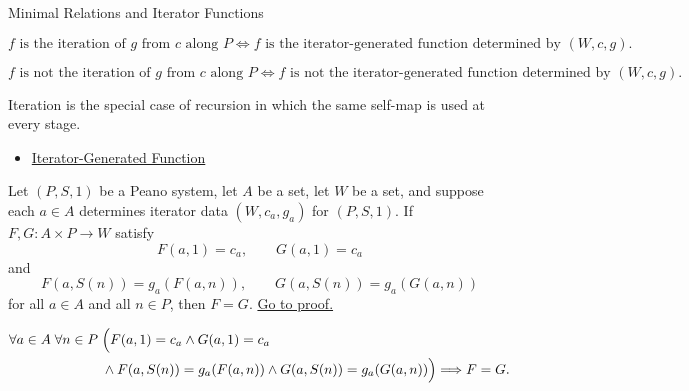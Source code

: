 \begin{topicbox}{Minimal Relations and Iterator Functions}
\begin{remark*}
\[
f \text{ is the iteration of } g \text{ from } c \text{ along } P
\Longleftrightarrow
f \text{ is the iterator-generated function determined by } (W,c,g).
\]
\end{remark*}


\begin{remark*}
\[
f \text{ is not the iteration of } g \text{ from } c \text{ along } P
\Longleftrightarrow
f \text{ is not the iterator-generated function determined by } (W,c,g).
\]
\end{remark*}

\begin{remark*}[Interpretation]
Iteration is the special case of recursion in which the same self-map is used
at every stage.
\end{remark*}

\begin{remark*}[Dependencies]
\begin{itemize}
  \item \hyperref[def:iterator-generated-function]{Iterator-Generated Function}
\end{itemize}
\end{remark*}

\begin{tcolorbox}[colback=corbox, colframe=corborder, arc=2pt,
  left=6pt, right=6pt, top=4pt, bottom=4pt,
  title={\small\textbf{Corollary (Uniqueness of Binary Iterator Operations)}},
  fonttitle=\small\bfseries]
\begin{corollary}
\label{cor:uniqueness-of-binary-iterator-operations}
Let $(P,S,1)$ be a Peano system, let $A$ be a set, let $W$ be a set, and
suppose each $a\in A$ determines iterator data $(W,c_a,g_a)$ for $(P,S,1)$.
If $F,G:A\times P\to W$ satisfy
\[
F(a,1)=c_a,\qquad G(a,1)=c_a
\]
and
\[
F(a,S(n))=g_a(F(a,n)),
\qquad
G(a,S(n))=g_a(G(a,n))
\]
for all $a\in A$ and all $n\in P$, then $F=G$.
\hyperref[prf:uniqueness-of-binary-iterator-operations]{Go to proof.}
\end{corollary}
\end{tcolorbox}

\begin{remark*}
\[
\begin{aligned}
\forall a\in A\;\forall n\in P\;&\Bigl(
F(a,1)=c_a\land G(a,1)=c_a\\
&\land F(a,S(n))=g_a(F(a,n))
\land G(a,S(n))=g_a(G(a,n))\Bigr)
\Longrightarrow F=G.
\end{aligned}
\]
\end{remark*}


\end{topicbox}
